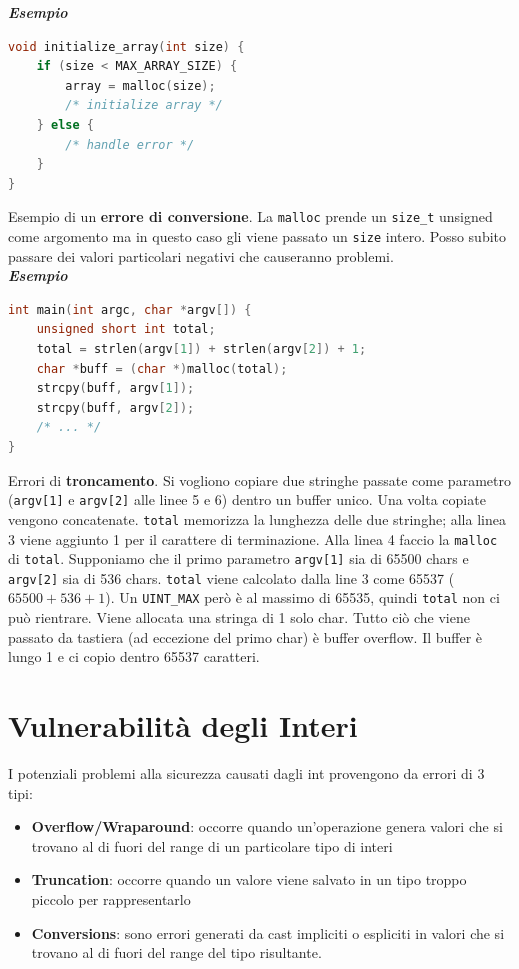\textbf{\textit{Esempio}}

\begin{lstlisting}[language=C,  basicstyle=\scriptsize]
void initialize_array(int size) {
    if (size < MAX_ARRAY_SIZE) {
        array = malloc(size);
        /* initialize array */
    } else {
        /* handle error */
    }
}\end{lstlisting}

Esempio di un \textbf{errore di conversione}. La \verb|malloc| prende un
\verb|size_t| unsigned come argomento ma in questo caso gli viene passato un
\verb|size| intero. Posso subito passare dei valori particolari negativi che
causeranno problemi.\\

\textbf{\textit{Esempio}}

\begin{lstlisting}[language=C,  basicstyle=\scriptsize]
int main(int argc, char *argv[]) {
    unsigned short int total;
    total = strlen(argv[1]) + strlen(argv[2]) + 1;
    char *buff = (char *)malloc(total);
    strcpy(buff, argv[1]);
    strcpy(buff, argv[2]);
    /* ... */
}\end{lstlisting}

Errori di \textbf{troncamento}. Si vogliono copiare due stringhe passate come
parametro (\verb|argv[1]| e \verb|argv[2]| alle linee 5 e 6) dentro un buffer unico.
Una volta copiate vengono concatenate. \verb|total| memorizza la lunghezza delle
due stringhe; alla linea 3 viene aggiunto 1 per il carattere di terminazione.
Alla linea 4 faccio la \verb|malloc| di \verb|total|. Supponiamo che il primo
parametro \verb|argv[1]| sia di 65500 chars e \verb|argv[2]| sia di 536 chars.
\verb|total| viene calcolato dalla line 3 come 65537 (\(65500 + 536 + 1\)). Un
\verb|UINT_MAX| però è al massimo di 65535, quindi \verb|total| non ci può rientrare.
Viene allocata una stringa di 1 solo char. Tutto ciò che viene passato da
tastiera (ad eccezione del primo char) è buffer overflow. Il buffer è lungo 1 e
ci copio dentro 65537 caratteri.

\section{Vulnerabilità degli Interi}

I potenziali problemi alla sicurezza causati dagli int provengono da errori di 3 tipi:

\begin{itemize}
    \item \textbf{Overflow/Wraparound}: occorre quando un'operazione genera valori
          che si trovano al di fuori del range di un particolare tipo di interi
    \item \textbf{Truncation}: occorre quando un valore viene salvato in un tipo
          troppo piccolo per rappresentarlo
    \item \textbf{Conversions}: sono errori generati da cast impliciti o espliciti
          in valori che si trovano al di fuori del range del tipo risultante.
\end{itemize}


